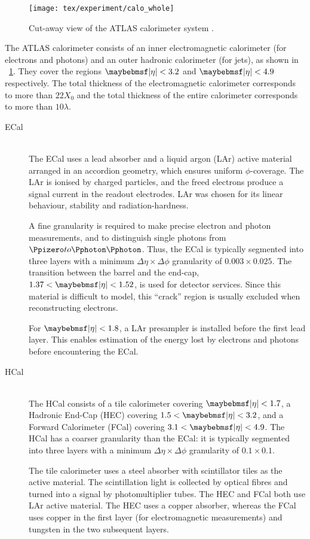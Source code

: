 \begin{figure}
	\texttt{[image: tex/experiment/calo\_whole]}
	\caption{Cut-away view of the ATLAS calorimeter system \cite{ATLAS-detector}.}
	\label{fig:calorimeters}
\end{figure}

The ATLAS calorimeter consists of an inner electromagnetic calorimeter (for electrons and 
photons) and an outer hadronic calorimeter (for jets), as shown in 
\Figure~\ref{fig:calorimeters}. They cover the regions $\mods{\eta} < 3.2$ and 
$\mods{\eta} < 4.9$ respectively. The total thickness of the electromagnetic calorimeter 
corresponds to more than $22 X_0$ and the total thickness of the entire calorimeter 
corresponds to more than $10 \lambda$.
\begin{description}
\item[\ac{ECal}] \hfill \\
	The \ac{ECal} uses a lead absorber and a liquid argon (LAr) active material arranged 
	in an accordion geometry, which ensures uniform $\phi$-coverage. The LAr is ionised 
	by charged particles, and the freed electrons produce a signal current in the readout 
	electrodes. LAr was chosen for its linear behaviour, stability and radiation-hardness.

	A fine granularity is required to make precise electron and photon measurements, and 
	to distinguish single photons from $\HepProcess{\Ppizero \HepTo \Pphoton \Pphoton}$. 
	Thus, the \ac{ECal} is typically segmented into three layers with a minimum 
	$\Delta\eta\times\Delta\phi$ granularity of $0.003 \times 0.025$. The transition 
	between the barrel and the end-cap, $1.37 < \mods{\eta} < 1.52$, is used for detector 
	services. Since this material is difficult to model, this ``crack'' region is usually 
	excluded when reconstructing electrons.

	For $\mods{\eta} < 1.8$, a LAr presampler is installed before the first lead layer. 
	This enables estimation of the energy lost by electrons and photons before 
	encountering the \ac{ECal}.
\item[\ac{HCal}] \hfill \\
	The \ac{HCal} consists of a tile calorimeter covering $\mods{\eta} < 1.7$, a Hadronic 
	End-Cap (HEC) covering $1.5 < \mods{\eta} < 3.2$, and a Forward Calorimeter (FCal) 
	covering $3.1 < \mods{\eta} < 4.9$. The \ac{HCal} has a coarser granularity than the
	\ac{ECal}: it is typically segmented into three layers with a minimum 
	$\Delta\eta\times\Delta\phi$ granularity of $0.1 \times 0.1$.

	The tile calorimeter uses a steel absorber with scintillator tiles as the active 
	material. The scintillation light is collected by optical fibres and turned into a 
	signal by photomultiplier tubes. The HEC and FCal both use LAr active material.
	The HEC uses a copper absorber, whereas the FCal uses copper in the first layer (for 
	electromagnetic measurements) and tungsten in the two subsequent layers.
\end{description}



